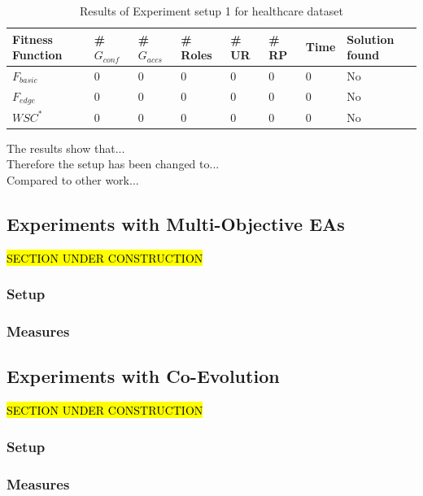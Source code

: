 \begin{table}
    \centering
    \begin{tabular}{|l|l|l|l|l|l|l|l|}
        \hline
        \rowcolor{myGray} 
        \textbf{Fitness Function} & \textbf{\# $G_{conf}$} & \textbf{\# $G_{accs}$} & \textbf{\# Roles} & \textbf{\# UR} & \textbf{\# RP} & \textbf{Time} & \textbf{Solution found}\\ \hline
        $F_{basic}$             &   0   &   0   &   0   &   0   &   0   &   0   & No\\ \hline
        $F_{edge}$              &   0   &   0   &   0   &   0   &   0   &   0   & No\\ \hline
        $WSC^*$                 &   0   &   0   &   0   &   0   &   0   &   0   & No\\ \hline
    \end{tabular}
    \caption{Results of Experiment setup 1 for healthcare dataset}
    \label{tab:results1}
\end{table}
The results show that...\\
Therefore the setup has been changed to...\\
Compared to other work...\\
\subsection{Experiments with Multi-Objective EAs}
\hl{SECTION UNDER CONSTRUCTION}\\
\subsubsection{Setup}
\subsubsection{Measures}

\subsection{Experiments with Co-Evolution}
\hl{SECTION UNDER CONSTRUCTION}\\
\subsubsection{Setup}
\subsubsection{Measures}

